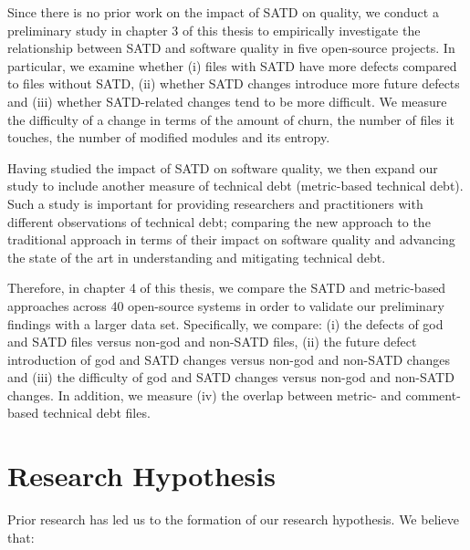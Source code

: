 Since there is no prior work on the impact of SATD on quality, we conduct a preliminary study in chapter 3 of this thesis to empirically investigate the relationship between SATD and software quality in five open-source projects. In particular, we examine whether (i) files with SATD have more defects compared to files without SATD, (ii) whether SATD changes introduce more future defects and (iii) whether SATD-related changes tend to be more difficult. We measure the difficulty of a change in terms of the amount of churn, the number of files it touches, the number of modified modules and its entropy. \par

Having studied the impact of SATD on software quality, we then expand our study to include another measure of technical debt (metric-based technical debt). Such a study is important for providing researchers and practitioners with different observations of technical debt; comparing the new approach to the traditional approach in terms of their impact on software quality and advancing the state of the art in understanding and mitigating technical debt.\par



Therefore, in chapter 4 of this thesis, we compare the SATD and metric-based approaches across 40 open-source systems in order to validate our preliminary findings with a larger data set. Specifically, we compare: (i) the defects of god and SATD files versus non-god and non-SATD files, (ii) the future defect introduction of god and SATD changes versus non-god and non-SATD changes and (iii) the difficulty of god and SATD changes versus non-god and non-SATD changes. In addition, we measure (iv) the overlap between metric- and comment-based technical debt files.

\iffalse
\section{Research Hypothesis}
Prior research has led us to the formation of our research hypothesis. We believe that:


